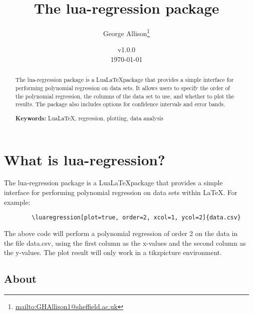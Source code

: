 \documentclass[11pt]{article}
\begin{document}
    \title{The {\ttfamily lua-regression} package}
    \author{George Allison\thanks{\href{mailto:GHAllison1@sheffield.ac.uk}{\ttfamily mailto:GHAllison1@sheffield.ac.uk}}}
    \date{v1.0.0\\ \today}

    \maketitle

    \begin{abstract}
        The {\ttfamily lua-regression} package is a Lua\LaTeX package that provides a simple interface for performing polynomial regression on data sets.
        It allows users to specify the order of the polynomial regression, the columns of the data set to use, and whether to plot the results.
        The package also includes options for confidence intervals and error bands.

        \vspace{1em}
        \noindent
        \textbf{Keywords:} LuaLaTeX, regression, plotting, data analysis
    \end{abstract}

    \tableofcontents

    \pagebreak

    \section{What is {\ttfamily lua-regression}?}

    The {\ttfamily lua-regression} package is a Lua\LaTeX package that provides a simple interface for performing polynomial regression on data sets within \LaTeX. For example:

    \begin{verbatim}
        \luaregression[plot=true, order=2, xcol=1, ycol=2]{data.csv}
    \end{verbatim}

    \noindent
    The above code will perform a polynomial regression of order 2 on the data in the file {\ttfamily data.csv}, using the first column as the x-values and the second column as the y-values.
    The plot result will only work in a tikzpicture environment.


    \subsection{About}
\end{document}
